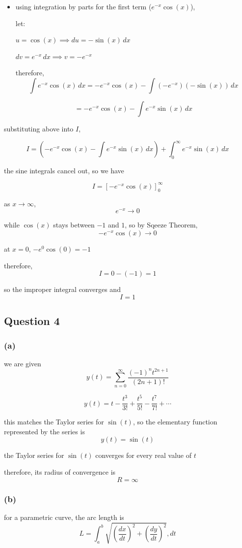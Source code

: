 \documentclass{article}
\begin{document}
\begin{itemize}
    \item using integration by parts for the first term ($e^{-x}\cos(x)$),

let:

$u = \cos(x) \implies du = -\sin(x)\,dx$

$dv = e^{-x}\,dx \implies v = -e^{-x}$

therefore,
$$\int e^{-x}\cos(x)\,dx = -e^{-x}\cos(x) - \int (-e^{-x})(-\sin(x))\,dx$$

$$= -e^{-x}\cos(x) - \int e^{-x}\sin(x)\,dx$$
\end{itemize}

substituting above into $I$,

\[
I = \left( -e^{-x}\cos(x) - \int e^{-x}\sin(x)\,dx \right) + \int_0^\infty e^{-x}\sin(x)\,dx
\]

the sine integrals cancel out, so we have

\[
I=\left[-e^{-x}\cos(x)\right]_0^\infty
\]

as $x\to\infty$,
\[
e^{-x}\to0
\]

while $\cos(x)$ stays between $-1$ and $1$, so by Sqeeze Theorem,
\[
-e^{-x}\cos(x)\to0
\]

at $x=0$, $-e^0\cos(0)=-1$

therefore,
\[
I=0-(-1)=1
\]

so the improper integral converges and
\[
\boxed{I=1}
\]

\subsection{Question 4}

\subsubsection*{(a)}
we are given
\[
y(t)=\sum_{n=0}^{\infty} \frac{(-1)^nt^{2n+1}}{(2n+1)!}
\]

\[
y(t)=t-\frac{t^3}{3!} + \frac{t^5}{5!} - \frac{t^7}{7!} + \cdots
\]

this matches the Taylor series for $\sin(t)$, so the elementary function represented by the series is
\[
\boxed{y(t)=\sin(t)}
\]

the Taylor series for $\sin(t)$ converges for every real value of $t$

therefore, its radius of convergence is
\[
\boxed{R=\infty}
\]

\subsubsection*{(b)}
for a parametric curve, the arc length is
\[L=\int_a^b \sqrt{\left(\frac{dx}{dt}\right)^2 + \left(\frac{dy}{dt}\right)^2},dt
\]
\end{document}

